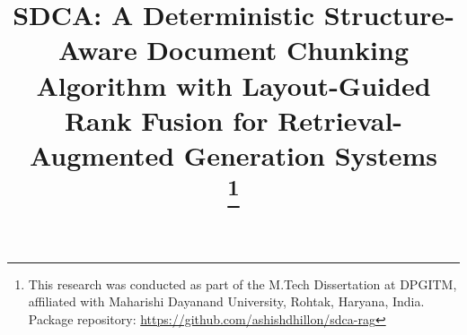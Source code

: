 \documentclass[conference]{IEEEtran}
\begin{document}
\title{SDCA: A Deterministic Structure-Aware Document Chunking Algorithm with Layout-Guided Rank Fusion for Retrieval-Augmented Generation Systems\\
\thanks{This research was conducted as part of the M.Tech Dissertation at DPGITM, affiliated with Maharishi Dayanand University, Rohtak, Haryana, India. Package repository: \url{https://github.com/ashishdhillon/sdca-rag}}
}

\author{
\and
{}
}

\maketitle
\end{document}
